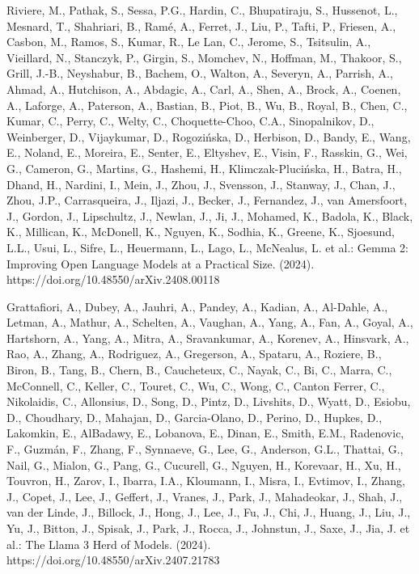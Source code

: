\documentclass[preprint,12pt]{elsarticle}
\begin{document}
\begin{thebibliography}{11}
  Riviere, M., Pathak, S., Sessa, P.G., Hardin, C., Bhupatiraju, S., Hussenot, L., Mesnard, T., Shahriari, B., Ramé, A., Ferret, J., Liu, P., Tafti, P., Friesen, A., Casbon, M., Ramos, S., Kumar, R., Le Lan, C., Jerome, S., Tsitsulin, A., Vieillard, N., Stanczyk, P., Girgin, S., Momchev, N., Hoffman, M., Thakoor, S., Grill, J.-B., Neyshabur, B., Bachem, O., Walton, A., Severyn, A., Parrish, A., Ahmad, A., Hutchison, A., Abdagic, A., Carl, A., Shen, A., Brock, A., Coenen, A., Laforge, A., Paterson, A., Bastian, B., Piot, B., Wu, B., Royal, B., Chen, C., Kumar, C., Perry, C., Welty, C., Choquette-Choo, C.A., Sinopalnikov, D., Weinberger, D., Vijaykumar, D., Rogozińska, D., Herbison, D., Bandy, E., Wang, E., Noland, E., Moreira, E., Senter, E., Eltyshev, E., Visin, F., Rasskin, G., Wei, G., Cameron, G., Martins, G., Hashemi, H., Klimczak-Plucińska, H., Batra, H., Dhand, H., Nardini, I., Mein, J., Zhou, J., Svensson, J., Stanway, J., Chan, J., Zhou, J.P., Carrasqueira, J., Iljazi, J., Becker, J., Fernandez, J., van Amersfoort, J., Gordon, J., Lipschultz, J., Newlan, J., Ji, J., Mohamed, K., Badola, K., Black, K., Millican, K., McDonell, K., Nguyen, K., Sodhia, K., Greene, K., Sjoesund, L.L., Usui, L., Sifre, L., Heuermann, L., Lago, L., McNealus, L. et al.:
  Gemma 2: Improving Open Language Models at a Practical Size. (2024).
  https://doi.org/10.48550/arXiv.2408.00118

  Grattafiori, A., Dubey, A., Jauhri, A., Pandey, A., Kadian, A., Al-Dahle, A., Letman, A., Mathur, A., Schelten, A., Vaughan, A., Yang, A., Fan, A., Goyal, A., Hartshorn, A., Yang, A., Mitra, A., Sravankumar, A., Korenev, A., Hinsvark, A., Rao, A., Zhang, A., Rodriguez, A., Gregerson, A., Spataru, A., Roziere, B., Biron, B., Tang, B., Chern, B., Caucheteux, C., Nayak, C., Bi, C., Marra, C., McConnell, C., Keller, C., Touret, C., Wu, C., Wong, C., Canton Ferrer, C., Nikolaidis, C., Allonsius, D., Song, D., Pintz, D., Livshits, D., Wyatt, D., Esiobu, D., Choudhary, D., Mahajan, D., Garcia-Olano, D., Perino, D., Hupkes, D., Lakomkin, E., AlBadawy, E., Lobanova, E., Dinan, E., Smith, E.M., Radenovic, F., Guzmán, F., Zhang, F., Synnaeve, G., Lee, G., Anderson, G.L., Thattai, G., Nail, G., Mialon, G., Pang, G., Cucurell, G., Nguyen, H., Korevaar, H., Xu, H., Touvron, H., Zarov, I., Ibarra, I.A., Kloumann, I., Misra, I., Evtimov, I., Zhang, J., Copet, J., Lee, J., Geffert, J., Vranes, J., Park, J., Mahadeokar, J., Shah, J., van der Linde, J., Billock, J., Hong, J., Lee, J., Fu, J., Chi, J., Huang, J., Liu, J., Yu, J., Bitton, J., Spisak, J., Park, J., Rocca, J., Johnstun, J., Saxe, J., Jia, J. et al.:
  The Llama 3 Herd of Models. (2024).
  https://doi.org/10.48550/arXiv.2407.21783


\end{thebibliography}
\end{document}
